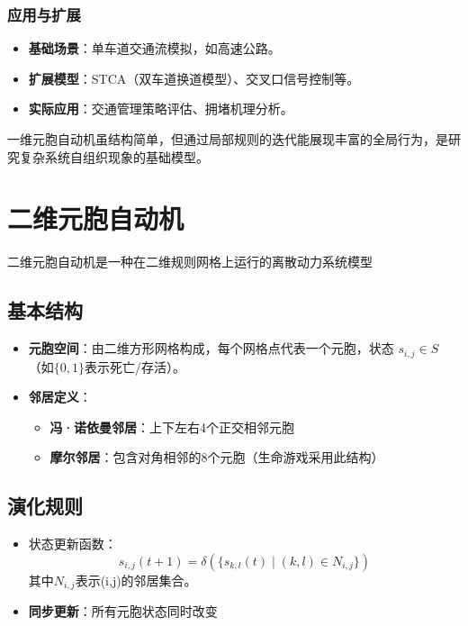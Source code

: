 \documentclass[forprint]{WHUBachelor}
\begin{document}
\subsubsection{应用与扩展}
\begin{itemize}
    \item \textbf{基础场景}：单车道交通流模拟，如高速公路。
    \item \textbf{扩展模型}：STCA（双车道换道模型）、交叉口信号控制等。
    \item \textbf{实际应用}：交通管理策略评估、拥堵机理分析。
\end{itemize}
一维元胞自动机虽结构简单，但通过局部规则的迭代能展现丰富的全局行为，是研究复杂系统自组织现象的基础模型。

\section{二维元胞自动机}
二维元胞自动机是一种在二维规则网格上运行的离散动力系统模型

\subsection{基本结构}
\begin{itemize}
    \item \textbf{元胞空间}：由二维方形网格构成，每个网格点代表一个元胞，状态 $s_{i,j} \in S$（如$\{0,1\}$表示死亡/存活）。
    \item \textbf{邻居定义}：
    \begin{itemize}
        \item \textbf{冯·诺依曼邻居}：上下左右4个正交相邻元胞
        \item \textbf{摩尔邻居}：包含对角相邻的8个元胞（生命游戏采用此结构）
    \end{itemize}
\end{itemize}

\subsection{演化规则}
\begin{itemize}
    \item 状态更新函数：
    \[
    s_{i,j}(t+1) = \delta\left(\{s_{k,l}(t)\mid (k,l)\in N_{i,j}\}\right)
    \]
    其中$N_{i,j}$表示(i,j)的邻居集合。
    \item \textbf{同步更新}：所有元胞状态同时改变
\end{itemize}
\end{document}

